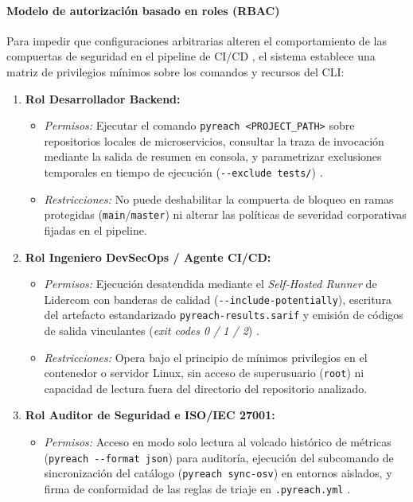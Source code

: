 \paragraph*{Modelo de autorización basado en roles (RBAC)}
Para impedir que configuraciones arbitrarias alteren el comportamiento de las compuertas de seguridad en el pipeline de CI/CD \cite{humble2010continuous}, el sistema establece una matriz de privilegios mínimos sobre los comandos y recursos del CLI:

\begin{enumerate}
    \item \textbf{Rol Desarrollador Backend:}
    \begin{itemize}
        \item \textit{Permisos:} Ejecutar el comando \texttt{pyreach <PROJECT\_\allowbreak PATH>} sobre repositorios locales de microservicios, consultar la traza de invocación mediante la salida de resumen en consola, y parametrizar exclusiones temporales en tiempo de ejecución (\texttt{-\allowbreak -\allowbreak exclude tests/\allowbreak }) \cite{wiegers2013software}.
        \item \textit{Restricciones:} No puede deshabilitar la compuerta de bloqueo en ramas protegidas (\texttt{main}/\texttt{master}) ni alterar las políticas de severidad corporativas fijadas en el pipeline.
    \end{itemize}

    \item \textbf{Rol Ingeniero DevSecOps / Agente CI/CD:}
    \begin{itemize}
        \item \textit{Permisos:} Ejecución desatendida mediante el \textit{Self-Hosted Runner} de Lidercom con banderas de calidad (\texttt{-\allowbreak -\allowbreak include-\allowbreak potentially}), escritura del artefacto estandarizado \texttt{pyreach-\allowbreak results.\allowbreak sarif} y emisión de códigos de salida vinculantes (\textit{exit codes 0 / 1 / 2}) \cite{oasis2019sarif}.
        \item \textit{Restricciones:} Opera bajo el principio de mínimos privilegios en el contenedor o servidor Linux, sin acceso de superusuario (\texttt{root}) ni capacidad de lectura fuera del directorio del repositorio analizado.
    \end{itemize}

    \item \textbf{Rol Auditor de Seguridad e ISO/IEC 27001:}
    \begin{itemize}
        \item \textit{Permisos:} Acceso en modo solo lectura al volcado histórico de métricas (\texttt{pyreach -\allowbreak -\allowbreak format json}) para auditoría, ejecución del subcomando de sincronización del catálogo (\texttt{pyreach sync-\allowbreak osv}) en entornos aislados, y firma de conformidad de las reglas de triaje en \texttt{.\allowbreak pyreach.\allowbreak yml} \cite{ladisa2023sok, gutierrez2024auditoria}.
    \end{itemize}
\end{enumerate}

